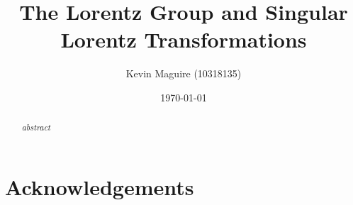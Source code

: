 \documentclass[floatfix,aps,prd,amsmath,amssymb]{revtex4}
\begin{document}
\title{The Lorentz Group and Singular Lorentz Transformations}
\author{Kevin Maguire (10318135)}
\date{\today}

\begin{abstract}
\textit{abstract}
\end{abstract}

\maketitle
{}


\newpage

\tableofcontents
{}

\newpage
 







 
\section{Acknowledgements}
 
\begin{thebibliography}{10}
\end{thebibliography}
\end{document}
